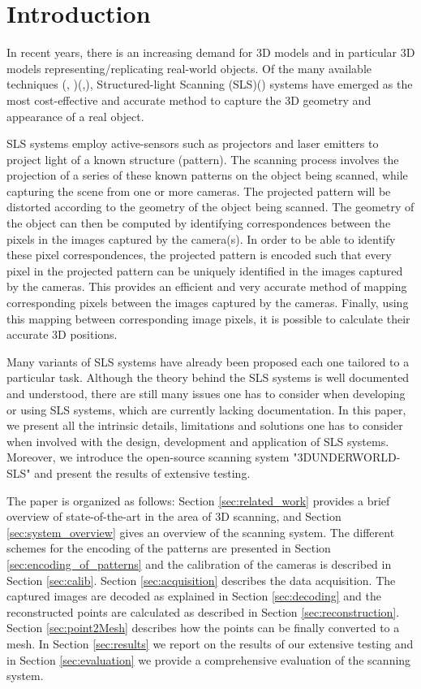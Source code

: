 \documentclass[final,12pt,3p]{elsarticle}
\begin{document}
\section{Introduction}
\label{sec:SLS}
In recent years, there is an increasing demand for 3D models and in particular 3D models representing/replicating real-world objects. Of the many available techniques (\cite{schuon2008high}, \cite{cui20103d})(\cite{bajracharya2012real},\cite{geiger2011stereoscan}), Structured-light Scanning (SLS)(\cite{gupta2011structured}) systems have emerged as the most cost-effective and accurate method to capture the 3D geometry and appearance of a real object. 

SLS systems employ active-sensors such as projectors and laser emitters to project light of a known structure (pattern). The scanning process involves the projection of a series of these known patterns on the object being scanned, while capturing the scene from one or more cameras. The projected pattern will be distorted according to the geometry of the object being scanned. The geometry of the object can then be computed by identifying correspondences between the pixels in the images captured by the camera(s). In order to be able to identify these pixel correspondences, the projected pattern is encoded such that every pixel in the projected pattern can be uniquely identified in the images captured by the cameras. This provides an efficient and very accurate method of mapping corresponding pixels between the images captured by the cameras. Finally, using this mapping between corresponding image pixels, it is possible to calculate their accurate 3D positions.

Many variants of SLS systems have already been proposed each one tailored to a particular task. Although the theory behind the SLS systems is well documented and understood, there are still many issues one has to consider when developing or using SLS systems, which are currently lacking documentation. In this paper, we present all the intrinsic details, limitations and solutions one has to consider when involved with the design, development and application of SLS systems. Moreover, we introduce the open-source scanning system 
"3DUNDERWORLD-SLS" and present the results of extensive testing.

The paper is organized as follows: Section \ref{sec:related_work} provides a brief overview of state-of-the-art in the area of 3D scanning, and Section \ref{sec:system_overview} gives an overview of the scanning system. The different schemes for the encoding of the patterns are presented in Section \ref{sec:encoding_of_patterns} and the calibration of the cameras is described in Section \ref{sec:calib}. Section \ref{sec:acquisition} describes the data acquisition. The captured images are decoded as explained in Section \ref{sec:decoding} and the reconstructed points are calculated as described in Section \ref{sec:reconstruction}. Section \ref{sec:point2Mesh} describes how the points can be finally converted to a mesh. In Section \ref{sec:results} we report on the results of our extensive testing and in Section \ref{sec:evaluation} we provide a comprehensive evaluation of the scanning system. 
\end{document}
